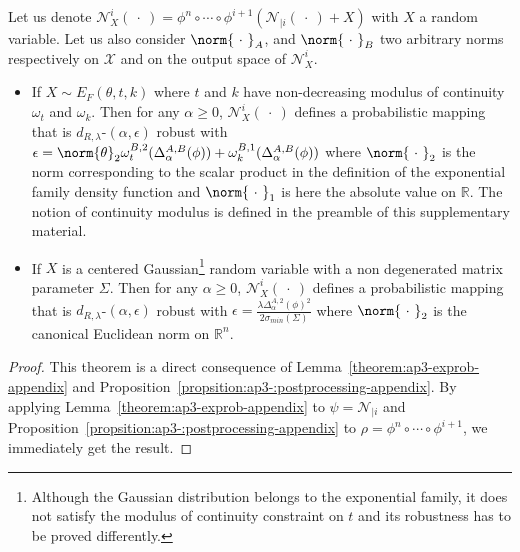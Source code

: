 \begin{theorem}
\label{theorem:ap3-netrob-appendix}
Let us denote $\mathcal{N}_{X}^i(\ \cdot\ )=\phi^n\circ \cdots \circ\phi^{i+1}(\mathcal{N}_{|i}(\ \cdot\ )+X)$ with $X$ a random variable. Let us also consider $\norm{\ \cdot\ }_{A}$, and $\norm{\ \cdot\ }_{B}$ two arbitrary norms respectively on $\mathcal{X}$ and on the output space of $\mathcal{N}_{X}^i$.




\begin{itemize}
  \item If $X\sim E_{F}(\theta,t,k)$  where $t$ and $k$ have non-decreasing modulus of continuity $\omega_t$ and $\omega_k$. Then for any $\alpha \geq 0$, $\mathcal{N}_{X}^i(\ \cdot\ )$ defines a probabilistic mapping that is $d_{R,\lambda}$-$(\alpha,\epsilon)$ robust with $\epsilon = \norm{\theta}_2 \omega^{B,2}_t(\Delta^{A,B}_{\alpha}(\phi)) +\omega_k^{B,1}(\Delta^{A,B}_{\alpha}(\phi)) $ where $\norm{\ \cdot\ }_2$ is the norm corresponding to the scalar product in the definition of the exponential family density function and $\norm{\ \cdot\ }_1$ is here the absolute value on $\mathbb{R}$. The notion of continuity modulus is defined in the preamble of this supplementary material.
    
\item If $X$ is a centered Gaussian\footnote{Although the Gaussian distribution belongs to the exponential family, it does not satisfy the modulus of continuity constraint on $t$ and its robustness has to be proved differently.} random variable with a non degenerated matrix parameter $\Sigma$. Then for any $\alpha \geq 0$, $\mathcal{N}_{X}^i(\ \cdot\ )$ defines a probabilistic mapping that is $d_{R,\lambda}$-$(\alpha,\epsilon)$ robust
with $ \epsilon = \frac{\lambda \Delta^{A,2}_{\alpha}(\phi)^2 }{2 \sigma_{min}(\Sigma) } $ where $\norm{\ \cdot\ }_2$ is the canonical Euclidean norm on $\mathbb{R}^n$.
\end{itemize}
\end{theorem}



\begin{proof}
This theorem is a direct consequence of Lemma~\ref{theorem:ap3-exprob-appendix} and Proposition~\ref{propsition:ap3-:postprocessing-appendix}. By applying Lemma~\ref{theorem:ap3-exprob-appendix} to $\psi=\mathcal{N}_{|i}$ and Proposition~\ref{propsition:ap3-:postprocessing-appendix} to $\rho=\phi^n\circ \cdots \circ\phi^{i+1}$, we immediately get the result.
\end{proof}

